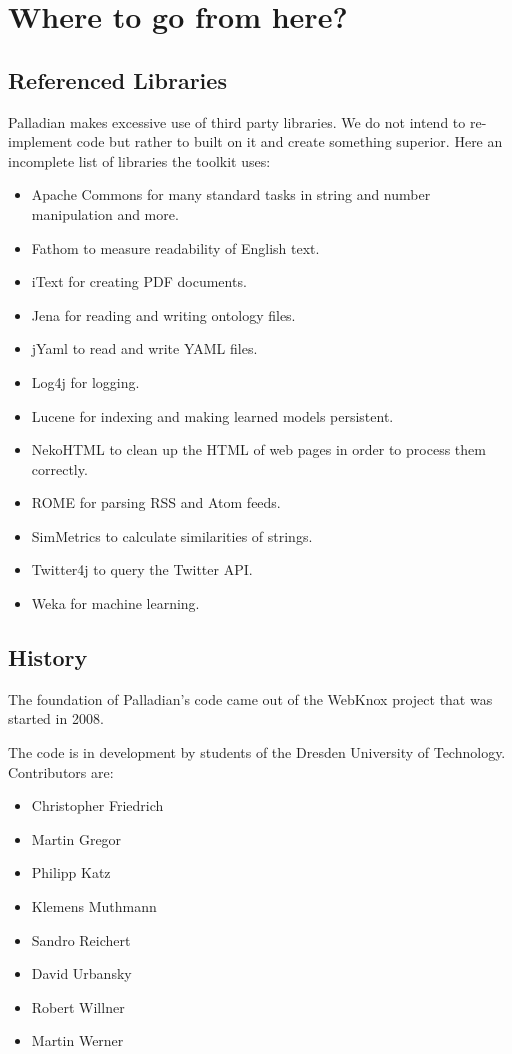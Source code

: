 \documentclass[a4paper,twoside]{book}      %
\begin{document}
\chapter{Where to go from here?}

\section{Referenced Libraries}
Palladian makes excessive use of third party libraries. We do not intend to re-implement code but rather to built on it and create something superior. Here an incomplete list of libraries the toolkit uses:
\begin{itemize}
\item Apache Commons \cite{apachecommons} for many standard tasks in string and number manipulation and more.
\item Fathom \cite{fathom} to measure readability of English text.
\item iText \cite{itext} for creating PDF documents.
\item Jena \cite{jena} for reading and writing ontology files.
\item jYaml \cite{jyaml} to read and write YAML files.
\item Log4j \cite{log4j} for logging.
\item Lucene \cite{lucene} for indexing and making learned models persistent.
\item NekoHTML \cite{nekohtml} to clean up the HTML of web pages in order to process them correctly.
\item ROME \cite{rome} for parsing RSS and Atom feeds.
\item SimMetrics \cite{simmetrics} to calculate similarities of strings.
\item Twitter4j \cite{twitter4j} to query the Twitter API.
\item Weka \cite{hall2009weka} for machine learning.
\end{itemize}

\section{History}
The foundation of Palladian's code came out of the WebKnox project\cite{webknox} that was started in 2008.%

The code is in development by students of the Dresden University of Technology. Contributors are:
\begin{itemize}
\item Christopher Friedrich
\item Martin Gregor
\item Philipp Katz
\item Klemens Muthmann
\item Sandro Reichert
\item David Urbansky
\item Robert Willner
\item Martin Werner
\end{itemize}



\end{document}
